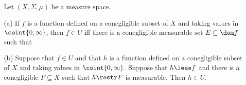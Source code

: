  Let $(X,\Sigma,\mu)$ be a measure
space.

(a) If $f$ is a function defined on a conegligible subset of $X$ and
taking values in $\coint{0,\infty}$, then $f\in U$ iff
there is a conegligible measurable set $E\subseteq\dom f$ such that


(b) Suppose that $f\in U$ and that $h$ is a function defined on a
conegligible subset of $X$ and taking values in $\coint{0,\infty}$.
Suppose that $h\leae f$ and there is a conegligible
$F\subseteq X$ such that $h\restr F$ is measurable.   Then $h\in U$.

